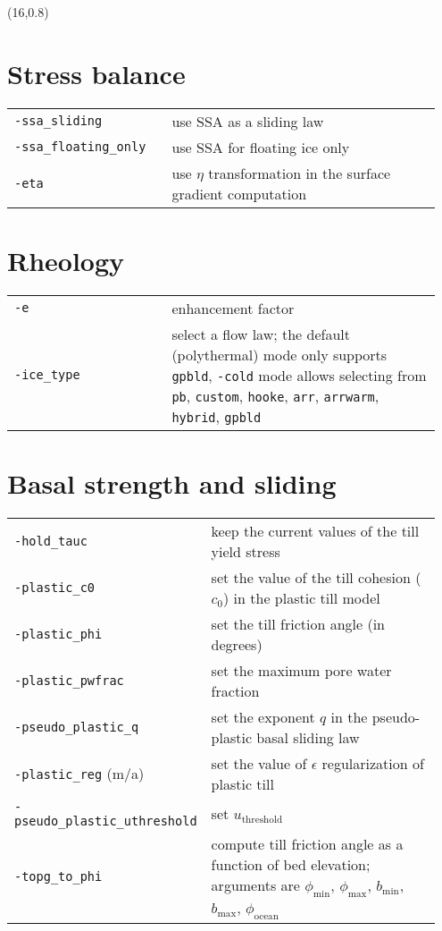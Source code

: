 \documentclass[landscape]{article}
\begin{document}
\begin{textblock}{15}(16,0.8)


\section{Stress balance}
\label{sec:stress-balance}

\begin{tabular}{@{}p{0.35\linewidth}p{0.6\linewidth}@{}}
\texttt{-ssa_sliding} & use SSA as a sliding law\\
\texttt{-ssa_floating_only} & use SSA for floating ice only\\
\texttt{-eta} & use $\eta$ transformation in the surface gradient computation\\
\end{tabular}

\section{Rheology}
\label{sec:rheology}
\begin{tabular}{@{}p{0.35\linewidth}p{0.6\linewidth}@{}}
\texttt{-e} & enhancement factor\\
\texttt{-ice_type} & select a flow law; the default (polythermal) mode only
supports \texttt{gpbld}, \texttt{-cold} mode allows selecting from \texttt{pb},
\texttt{custom}, \texttt{hooke}, \texttt{arr}, \texttt{arrwarm},
\texttt{hybrid}, \texttt{gpbld}\\
\end{tabular}


\section{Basal strength and sliding}
\label{sec:basal-strength}
\begin{tabular}{@{}p{0.35\linewidth}p{0.6\linewidth}@{}}
\texttt{-hold_tauc} & keep the current values of the till yield stress\\
\texttt{-plastic_c0} & set the value of the till cohesion ($c_{0}$) in the
plastic till model\\
\texttt{-plastic_phi} & set the till friction angle (in degrees)\\
\texttt{-plastic_pwfrac} & set the maximum pore water fraction\\
\texttt{-pseudo_plastic_q} & set the exponent $q$ in the pseudo-plastic basal
sliding law\\
\texttt{-plastic_reg} (m/a) & set the value of $\epsilon$ regularization of plastic
till\\
\texttt{-pseudo_plastic_uthreshold} & set $u_{\mathrm{threshold}}$\\
\texttt{-topg_to_phi} & compute till friction angle as a function of bed
elevation; arguments are $\phi_{\mathrm{min}}$, $\phi_{\mathrm{max}}$, $b_{\mathrm{min}}$, $b_{\mathrm{max}}$, $\phi_{\mathrm{ocean}}$
\end{tabular}



\end{textblock}
\end{document}

